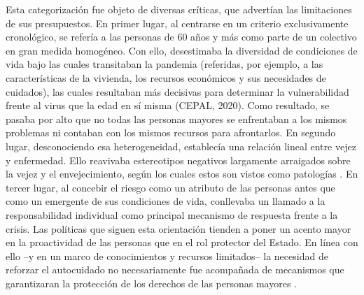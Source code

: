 \begin{refsection}
Esta categorización fue objeto de diversas críticas, que advertían las limitaciones de sus presupuestos. En primer lugar, al centrarse en un criterio exclusivamente cronológico, se refería a las personas de 60 años y más como parte de un colectivo en gran medida homogéneo. Con ello, desestimaba la diversidad de condiciones de vida bajo las cuales transitaban la pandemia (referidas, por ejemplo, a las características de la vivienda, los recursos económicos y sus necesidades de cuidados), las cuales resultaban más decisivas para determinar la vulnerabilidad frente al virus que la edad en sí misma (CEPAL, 2020). Como resultado, se pasaba por alto que no todas las personas mayores se enfrentaban a los mismos problemas ni contaban con los mismos recursos para afrontarlos. En segundo lugar, desconociendo esa heterogeneidad, establecía una relación lineal entre vejez y enfermedad. Ello reavivaba estereotipos negativos largamente arraigados sobre la vejez y el envejecimiento, según los cuales estos son vistos como patologías \protect\parencite{4168-CUNZOLO2021}. En tercer lugar, al concebir el riesgo como un atributo de las personas antes que como un emergente de sus condiciones de vida, conllevaba un llamado a la responsabilidad individual como principal mecanismo de respuesta frente a la crisis. Las políticas que siguen esta orientación tienden a poner un acento mayor en la proactividad de las personas que en el rol protector del Estado. En línea con ello –y en un marco de conocimientos y recursos limitados– la necesidad de reforzar el autocuidado no necesariamente fue acompañada de mecanismos que garantizaran la protección de los derechos de las personas mayores \protect\parencite{4206-VENTURIELLO2023}.


\end{refsection}
